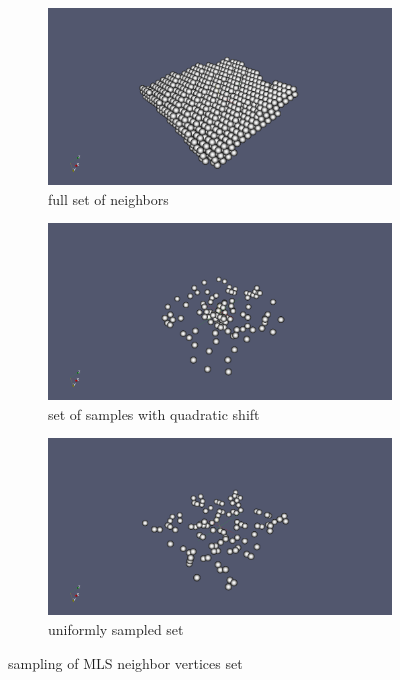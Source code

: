 \begin{figure}
	\begin{center}
		\begin{subfigure}[b]{0.9\textwidth}
			\includegraphics[width=\textwidth]{figures/SamplingFullDomain.png}
			\caption{full set of neighbors}
		\end{subfigure}
		\begin{subfigure}[b]{0.9\textwidth}
			\includegraphics[width=\textwidth]{figures/SamplingQuadratic.png}
			\caption{set of samples with quadratic shift}
		\end{subfigure}
		\begin{subfigure}[b]{0.9\textwidth}
			\includegraphics[width=\textwidth]{figures/SamplingUniform.png}
			\caption{uniformly sampled set}
		\end{subfigure}
	\end{center}
	\caption{sampling of MLS neighbor vertices set} \label{fig:cluster_sampled}
\end{figure}
